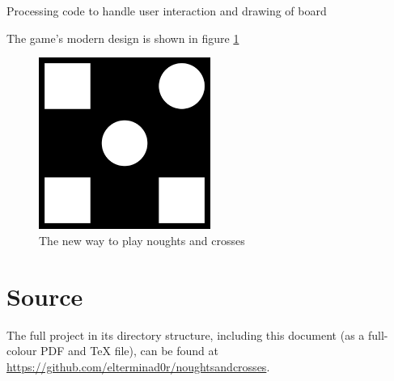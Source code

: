\documentclass[a4paper,11pt]{article}
\newenvironment{longlisting}
{\addvspace{\baselineskip}\captionsetup{type=listing}}
{\addvspace{\baselineskip}}
\begin{document}
\begin{longlisting}
\inputminted{python}{../noughtsandcrosses.pyde}
\caption{Processing code to handle user interaction and drawing of board}\label{lst:procpy}
\end{longlisting}

    The game's modern design is shown in figure \ref{fig:proc}

\begin{figure}[H]
\begin{center}
\includegraphics[width=0.5\textwidth]{../win_screenshot_20180712_110639.png}
\caption{The new way to play noughts and crosses}\label{fig:proc}
\end{center}
\end{figure}

    \section{Source}

    The full project in its directory structure, including this document (as a
    full-colour PDF and \TeX{} file), can be found at
    \url{https://github.com/elterminad0r/noughtsandcrosses}.
\end{document}
